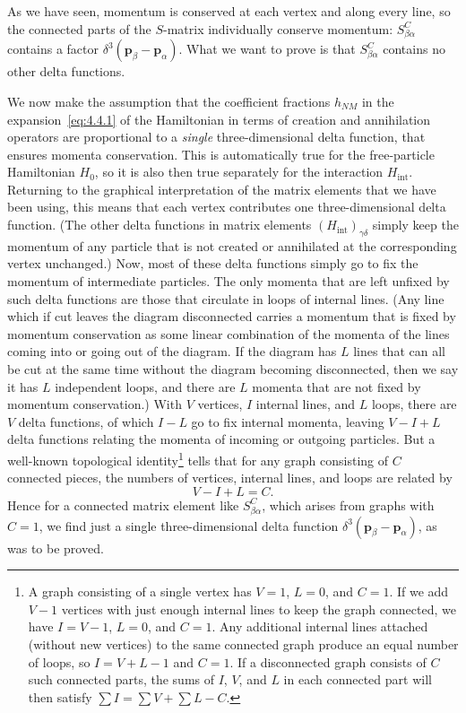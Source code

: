 As we have seen, momentum is conserved at each vertex and along every line, so
the connected parts of the $S$-matrix individually conserve momentum:
$S^C_{\beta\alpha}$ contains a factor $\delta^3(\mathbf{p}_\beta-
\mathbf{p}_\alpha)$. What we want to prove is that $S^C_{\beta\alpha}$ contains
no other delta functions.

We now make the assumption that the coefficient fractions $h_{NM}$ in the
expansion~\eqref{eq:4.4.1} of the Hamiltonian in terms of creation and annihilation
operators are proportional to a \emph{single} three-dimensional delta function,
that ensures momenta conservation. This is automatically true for the
free-particle Hamiltonian $H_0$, so it is also then true separately for the
interaction $H_{\mathrm{int}}$. Returning to the graphical interpretation of
the matrix elements that we have been using, this means that each vertex
contributes one three-dimensional delta function. (The other delta functions in
matrix elements $(H_{\mathrm{int}})_{\gamma\delta}$ simply keep the momentum of
any particle that is not created or annihilated at the corresponding vertex
unchanged.) Now, most of these delta functions simply go to fix the momentum of
intermediate particles. The only momenta that are left unfixed by such delta
functions are those that circulate in loops of internal lines. (Any line which
if cut leaves the diagram disconnected carries a momentum that is fixed by
momentum conservation as some linear combination of the momenta of the lines
coming into or going out of the diagram. If the diagram has $L$ lines that can
all be cut at the same time without the diagram becoming disconnected, then we
say it has $L$ independent loops, and there are $L$ momenta that are not fixed
by momentum conservation.) With $V$ vertices, $I$ internal lines, and $L$
loops, there are $V$ delta functions, of which $I-L$ go to fix internal
momenta, leaving $V-I+L$ delta functions relating the momenta of incoming or
outgoing particles. But a well-known topological identity\footnote{A graph
consisting of a single vertex has $V=1$, $L=0$, and $C=1$. If we add $V-1$
vertices with just enough internal lines to keep the graph connected, we have
$I=V-1$, $L=0$, and $C=1$. Any additional internal lines attached (without new
vertices) to the same connected graph produce an equal number of loops, so
$I=V+L-1$ and $C=1$. If a disconnected graph consists of $C$ such connected
parts, the sums of $I$, $V$, and $L$ in each connected part will then satisfy
$\sum I=\sum V+\sum L-C$.} tells that for any graph consisting of $C$
connected pieces, the numbers of vertices, internal lines, and loops are
related by
\begin{equation}
V-I+L=C.
\tag{4.4.7}
\label{eq:4.4.7}
\end{equation}
Hence for a connected matrix element like $S^C_{\beta\alpha}$, which arises
from graphs with $C=1$, we find just a single three-dimensional delta function
$\delta^3(\mathbf{p}_\beta-\mathbf{p}_\alpha)$, as was to be proved.

